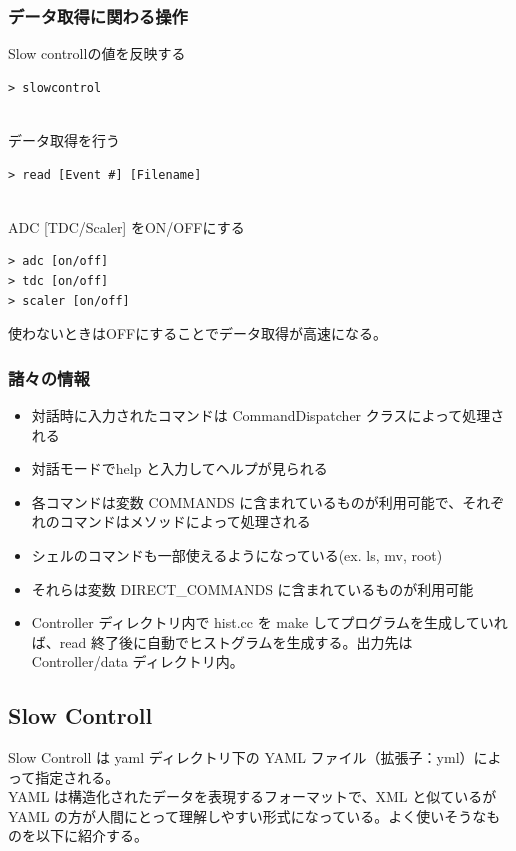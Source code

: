\subsubsection{データ取得に関わる操作}
Slow controllの値を反映する
\begin{shadebox}
\begin{verbatim}
> slowcontrol
\end{verbatim}
\end{shadebox}
　\\
データ取得を行う
\begin{shadebox}
\begin{verbatim}
> read [Event #] [Filename]
\end{verbatim}
\end{shadebox}
　\\
ADC [TDC/Scaler] をON/OFFにする
\begin{shadebox}
\begin{verbatim}
> adc [on/off]
> tdc [on/off]
> scaler [on/off]
\end{verbatim}
\end{shadebox}
使わないときはOFFにすることでデータ取得が高速になる。

\subsubsection{諸々の情報}
\begin{itemize}
\item 対話時に入力されたコマンドは CommandDispatcher クラスによって処理される
\item 対話モードでhelp と入力してヘルプが見られる
\item 各コマンドは変数 COMMANDS に含まれているものが利用可能で、それぞれのコマンドはメソッドによって処理される
\item シェルのコマンドも一部使えるようになっている(ex. ls, mv, root)
\item それらは変数 DIRECT\_COMMANDS に含まれているものが利用可能
\item Controller ディレクトリ内で hist.cc を make してプログラムを生成していれば、read 終了後に自動でヒストグラムを生成する。出力先は Controller/data ディレクトリ内。
\end{itemize}

\newpage
\subsection{Slow Controll}
Slow Controll は yaml ディレクトリ下の YAML ファイル（拡張子：yml）によって指定される。\\
YAML は構造化されたデータを表現するフォーマットで、XML と似ているが YAML の方が人間にとって理解しやすい形式になっている。よく使いそうなものを以下に紹介する。

